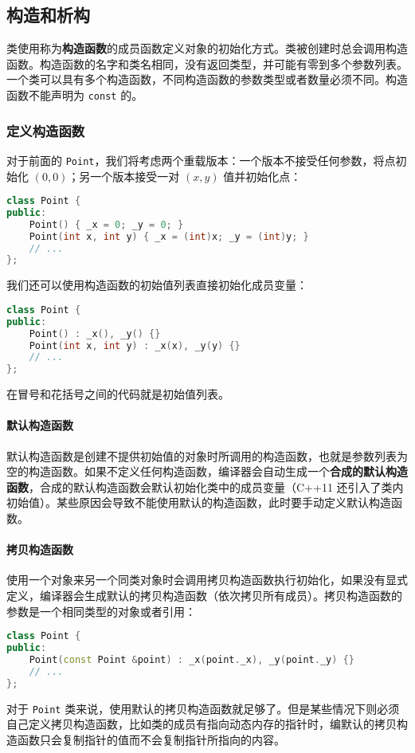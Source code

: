 \documentclass[hyperref,UTF8]{article}
\begin{document}
\subsection{构造和析构} \label{sec:constructor}

类使用称为\textbf{构造函数}的成员函数定义对象的初始化方式。类被创建时总会调用构造函数。构造函数的名字和类名相同，没有返回类型，并可能有零到多个参数列表。一个类可以具有多个构造函数，不同构造函数的参数类型或者数量必须不同。构造函数不能声明为 \texttt{const} 的。

\subsubsection{定义构造函数}

对于前面的 \texttt{Point}，我们将考虑两个重载版本：一个版本不接受任何参数，将点初始化 $(0,0)$；另一个版本接受一对 $(x,y)$ 值并初始化点：
\begin{lstlisting}[language=c++]
class Point {
public:
    Point() { _x = 0; _y = 0; }
    Point(int x, int y) { _x = (int)x; _y = (int)y; }
    // ...
};
\end{lstlisting}
我们还可以使用构造函数的初始值列表直接初始化成员变量：
\begin{lstlisting}[language=c++]
class Point {
public:
    Point() : _x(), _y() {}
    Point(int x, int y) : _x(x), _y(y) {}
    // ...
};
\end{lstlisting}
在冒号和花括号之间的代码就是初始值列表。

\paragraph{默认构造函数} \label{sec:default_constructor}

默认构造函数是创建不提供初始值的对象时所调用的构造函数，也就是参数列表为空的构造函数。如果不定义任何构造函数，编译器会自动生成一个\textbf{合成的默认构造函数}，合成的默认构造函数会默认初始化类中的成员变量（C++11 还引入了类内初始值）。某些原因会导致不能使用默认的构造函数，此时要手动定义默认构造函数。

\paragraph{拷贝构造函数}

使用一个对象来另一个同类对象时会调用拷贝构造函数执行初始化，如果没有显式定义，编译器会生成默认的拷贝构造函数（依次拷贝所有成员）。拷贝构造函数的参数是一个相同类型的对象或者引用：
\begin{lstlisting}[language=c++]
class Point {
public:
    Point(const Point &point) : _x(point._x), _y(point._y) {}
    // ...
};
\end{lstlisting}
对于 \texttt{Point} 类来说，使用默认的拷贝构造函数就足够了。但是某些情况下则必须自己定义拷贝构造函数，比如类的成员有指向动态内存的指针时，编默认的拷贝构造函数只会复制指针的值而不会复制指针所指向的内容。
\end{document}
